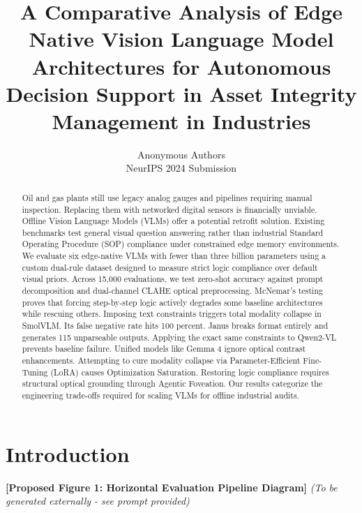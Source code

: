 \documentclass{article}
\title{A Comparative Analysis of Edge Native Vision Language Model Architectures for Autonomous Decision Support in Asset Integrity Management in Industries}
\author{
  Anonymous Authors \\
  NeurIPS 2024 Submission \\
}
\begin{document}
\maketitle

\begin{abstract}
Oil and gas plants still use legacy analog gauges and pipelines requiring manual inspection. Replacing them with networked digital sensors is financially unviable. Offline Vision Language Models (VLMs) offer a potential retrofit solution. Existing benchmarks test general visual question answering rather than industrial Standard Operating Procedure (SOP) compliance under constrained edge memory environments. We evaluate six edge-native VLMs with fewer than three billion parameters using a custom dual-rule dataset designed to measure strict logic compliance over default visual priors. Across 15,000 evaluations, we test zero-shot accuracy against prompt decomposition and dual-channel CLAHE optical preprocessing. McNemar’s testing proves that forcing step-by-step logic actively degrades some baseline architectures while rescuing others. Imposing text constraints triggers total modality collapse in SmolVLM. Its false negative rate hits 100 percent. Janus breaks format entirely and generates 115 unparseable outputs. Applying the exact same constraints to Qwen2-VL prevents baseline failure. Unified models like Gemma 4 ignore optical contrast enhancements. Attempting to cure modality collapse via Parameter-Efficient Fine-Tuning (LoRA) causes Optimization Saturation. Restoring logic compliance requires structural optical grounding through Agentic Foveation. Our results categorize the engineering trade-offs required for scaling VLMs for offline industrial audits.
\end{abstract}


\section*{Introduction}


\textbf{[Proposed Figure 1: Horizontal Evaluation Pipeline Diagram]}
\textit{(To be generated externally - see prompt provided)}
\end{document}
